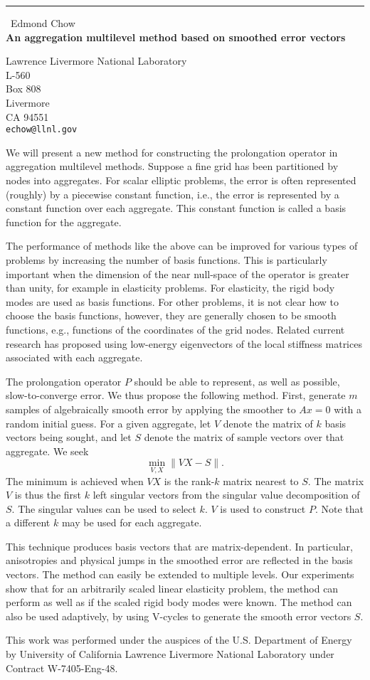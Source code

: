 \documentclass{report}
\begin{document}
\begin{center}
\rule{6in}{1pt} \
{\large Edmond Chow \\
{\bf An aggregation multilevel method based on smoothed error vectors}}

Lawrence Livermore National Laboratory \\ L-560 \\ Box 808 \\ Livermore \\ CA 94551
\\
{\tt echow@llnl.gov}\end{center}

We will present a new method for constructing the prolongation
operator in aggregation multilevel methods. Suppose a fine grid
has been partitioned by nodes into aggregates. For scalar
elliptic problems, the error is often represented (roughly) by a
piecewise constant function, i.e., the error is represented
by a constant function over each aggregate. This constant
function is called a basis function for the aggregate.

The performance of methods like the above can be improved
for various types of problems by increasing the number of
basis functions. This is particularly important when the dimension of the
near null-space of the operator is greater than unity, for example
in elasticity problems. For elasticity, the rigid body modes
are used as basis functions. For other problems, it is not clear
how to choose the basis functions, however, they are generally
chosen to be smooth functions, e.g., functions of the coordinates
of the grid nodes. Related current research has proposed using
low-energy eigenvectors of the local stiffness matrices associated
with each aggregate.

The prolongation operator $P$ should be able to represent, as well as possible,
slow-to-converge error. We thus propose the following method.
First, generate $m$ samples of algebraically smooth
error by applying the smoother to $Ax=0$ with a random initial guess.
For a given aggregate,
let $V$ denote the matrix of $k$ basis vectors being sought, and let $S$ denote
the matrix of sample vectors over that aggregate. We seek
\[
\min_{V,X} \| V X - S \| .
\]
The minimum is achieved when $VX$ is the rank-$k$ matrix nearest to $S$.
The matrix $V$ is thus the first $k$ left singular vectors
from the singular value decomposition of $S$. The singular values can
be used to select $k$. $V$ is used to construct $P$. Note that a
different $k$ may be used for each aggregate.

This technique produces basis vectors that are matrix-dependent.
In particular, anisotropies and physical jumps in the smoothed error
are reflected in the basis vectors. The method can easily be extended
to multiple levels. Our experiments show that for an arbitrarily
scaled linear elasticity problem, the method can perform as well
as if the scaled rigid body modes were known. The method can also
be used adaptively, by using V-cycles to generate the smooth
error vectors $S$.

This work was performed under the auspices of the U.S. Department of
Energy by University of California Lawrence Livermore National
Laboratory under Contract W-7405-Eng-48.
\end{document}
